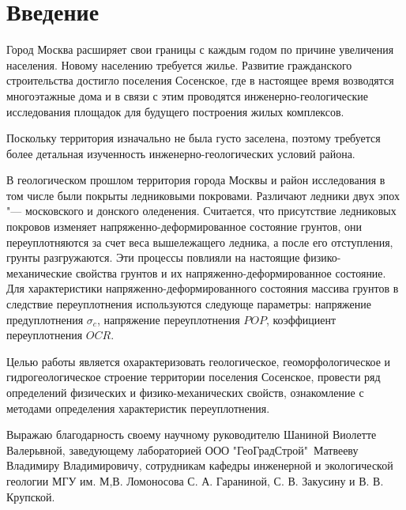 \chapter*{Введение}                         %

Город Москва расширяет свои границы с каждым годом по причине увеличения населения. 
Новому населению требуется жилье. Развитие гражданского строительства достигло поселения 
Сосенское, где в настоящее время возводятся многоэтажные дома и в связи с этим проводятся 
инженерно-геологические исследования площадок для будущего построения жилых 
комплексов. %



Поскольку территория изначально не была густо заселена, поэтому требуется более детальная 
изученность инженерно-геологических условий района.

%
В геологическом прошлом территория города Москвы и район исследования в том числе были 
покрыты ледниковыми покровами. Различают ледники двух эпох "--- московского и донского оледенения. 
Считается, что присутствие ледниковых покровов изменяет напряженно-деформированное состояние 
грунтов, они переуплотняются за счет веса вышележащего ледника, а после его отступления, 
грунты разгружаются. Эти процессы повлияли на настоящие физико-механические свойства грунтов 
и их напряженно-деформированное состояние. Для характеристики напряженно-деформированного 
состояния массива грунтов в следствие переуплотнения используются следующе параметры:
напряжение предуплотнения $\sigma_c$, 
напряжение переуплотнения $POP$,
коэффициент переуплотнения $OCR$.

Целью работы является охарактеризовать геологическое, геоморфологическое и 
гидрогеологическое строение территории поселения Сосенское, провести ряд 
определений физических и физико-механических 
свойств, ознакомление с методами определения характеристик переуплотнения.


Выражаю благодарность своему научному руководителю Шаниной 
Виолетте Валерьвной, заведующему лабораторией ООО "ГеоГрадСтрой"\ 
Матвееву Владимиру Владимировичу, сотрудникам кафедры инженерной 
и экологической геологии МГУ им. М,В. Ломоносова С. А. Гараниной, С. В. Закусину и 
В. В. Крупской.